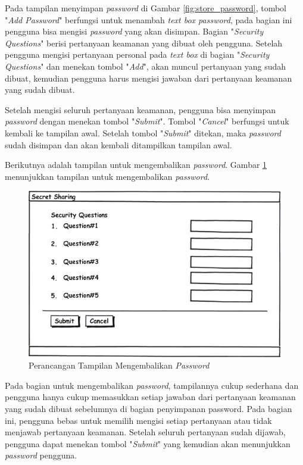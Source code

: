 Pada tampilan menyimpan \textit{password} di Gambar \ref{fig:store_password}, tombol "\textit{Add Password}" berfungsi untuk menambah \textit{text box password}, pada bagian ini pengguna bisa mengisi \textit{password} yang akan disimpan. Bagian "\textit{Security Questions}" berisi pertanyaan keamanan yang dibuat oleh pengguna. Setelah pengguna mengisi pertanyaan personal pada \textit{text box} di bagian "\textit{Security Questions}" dan menekan tombol "\textit{Add}", akan muncul pertanyaan yang sudah dibuat, kemudian pengguna harus mengisi jawaban dari pertanyaan keamanan yang sudah dibuat.

Setelah mengisi seluruh pertanyaan keamanan, pengguna bisa menyimpan \textit{password} dengan menekan tombol "\textit{Submit}". Tombol "\textit{Cancel}" berfungsi untuk kembali ke tampilan awal. Setelah tombol "\textit{Submit}" ditekan, maka \textit{password} sudah disimpan dan akan kembali ditampilkan tampilan awal.

Berikutnya adalah tampilan untuk mengembalikan \textit{password}. Gambar \ref{fig:retrieve_password} menunjukkan tampilan untuk mengembalikan \textit{password}.

\begin{figure}[H]
	\centerline{\includegraphics[scale=0.5]{Gambar/retrieve_password}}
	\caption{Perancangan Tampilan Mengembalikan \textit{Password}}\label{fig:retrieve_password}
\end{figure}

Pada bagian untuk mengembalikan \textit{password}, tampilannya cukup sederhana dan pengguna hanya cukup memasukkan setiap jawaban dari pertanyaan keamanan yang sudah dibuat sebelumnya di bagian penyimpanan password. Pada bagian ini, pengguna bebas untuk memilih mengisi setiap pertanyaan atau tidak menjawab pertanyaan keamanan. Setelah seluruh pertanyaan sudah dijawab, pengguna dapat menekan tombol "\textit{Submit}" yang kemudian akan menunjukkan \textit{password} pengguna.

